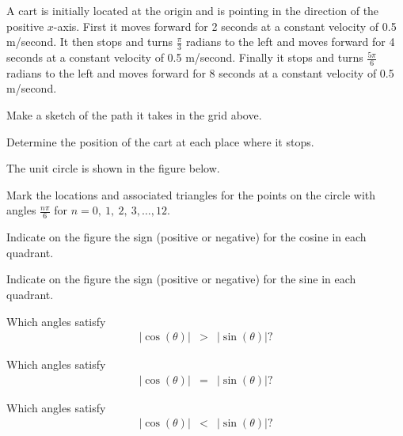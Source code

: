 \begin{problem}
\item A cart is initially located at the origin and is pointing in the
  direction of the positive $x$-axis. First it moves forward for 2
  seconds at a constant velocity of 0.5 m/second. It then stops and
  turns $\frac{\pi}{3}$ radians to the left and moves forward for 4
  seconds at a constant velocity of 0.5 m/second. Finally it stops and
  turns $\frac{5\pi}{6}$ radians to the left and moves forward for 8
  seconds at a constant velocity of 0.5 m/second.

  \scalebox{0.65}{}

  \begin{subproblem}
    \item Make a sketch of the path it takes in the grid above.
    \item Determine the position of the cart at each place where it
      stops.
      \vfill
  \end{subproblem}

  \clearpage

\item The unit circle is shown in the figure below.

  \scalebox{0.85}{}

  \begin{subproblem}
  \item Mark the locations and associated triangles for the points on
    the circle with angles $\frac{n\pi}{6}$ for $n=0,~1,~2,~3,\ldots,12$.
  \item Indicate on the figure the sign (positive or negative) for the
    cosine in each quadrant.
  \item Indicate on the figure the sign (positive or negative) for the
    sine in each quadrant.

    \clearpage

  \item Which angles satisfy
    \begin{eqnarray*}
      |\cos(\theta)| & > & |\sin(\theta) |?
    \end{eqnarray*}
    \vfill
  \item Which angles satisfy
    \begin{eqnarray*}
      |\cos(\theta)| & = & |\sin(\theta) |?
    \end{eqnarray*}
    \vfill
  \item Which angles satisfy
    \begin{eqnarray*}
      |\cos(\theta)| & < & |\sin(\theta) |?
    \end{eqnarray*}
    \vfill
  \end{subproblem}



\end{problem}
